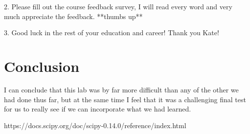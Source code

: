 \documentclass[12pt]{report}
\begin{document}
2. Please fill out the course feedback survey, I will read every word and very much appreciate
the feedback.
**thumbs up**

3. Good luck in the rest of your education and career!
Thank you Kate!

\section{Conclusion}
I can conclude that this lab was by far more difficult than any of the other we had done thus far, but at the same time I feel that it was a challenging final test for us to really see if we can incorporate what we had learned. 


\newpage


\begin{thebibliography}{111}

https://docs.scipy.org/doc/scipy-0.14.0/reference/index.html




\end{thebibliography}
\end{document}
